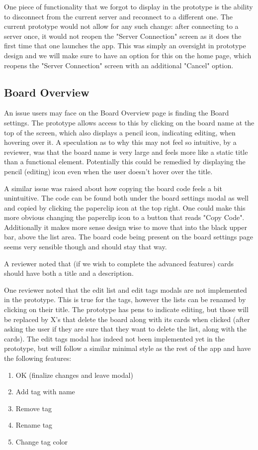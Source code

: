     One piece of functionality that we forgot to display in the prototype is the ability to disconnect from the current server and reconnect to a different one. The current prototype would not allow for any such change: after connecting to a server once, it would not reopen the "Server Connection" screen as it does the first time that one launches the app. This was simply an oversight in prototype design and we will make sure to have an option for this on the home page, which reopens the "Server Connection" screen with an additional "Cancel" option.

\subsection{Board Overview}

    An issue users may face on the Board Overview page is finding the Board settings. The prototype allows access to this by clicking on the board name at the top of the screen, which also displays a pencil icon, indicating editing, when hovering over it. A speculation as to why this may not feel so intuitive, by a reviewer, was that the board name is very large and feels more like a static title than a functional element. Potentially this could be remedied by displaying the pencil (editing) icon even when the user doesn't hover over the title.

    A similar issue was raised about how copying the board code feels a bit unintuitive. The code can be found both under the board settings modal as well and copied by clicking the paperclip icon at the top right. One could make this more obvious changing the paperclip icon to a button that reads "Copy Code". Additionally it makes more sense design wise to move that into the black upper bar, above the list area. The board code being present on the board settings page seems very sensible though and should stay that way.

    A reviewer noted that (if we wish to complete the advanced features) cards should have both a title and a description.

    One reviewer noted that the edit list and edit tags modals are not implemented in the prototype. This is true for the tags, however the lists can be renamed by clicking on their title. The prototype has pens to indicate editing, but those will be replaced by X's that delete the board along with its cards when clicked (after asking the user if they are sure that they want to delete the list, along with the cards). The edit tags modal has indeed not been implemented yet in the prototype, but will follow a similar minimal style as the rest of the app and have the following features:
\begin{enumerate}
    \item OK (finalize changes and leave modal)
    \item Add tag with name
    \item Remove tag
    \item Rename tag
    \item Change tag color
\end{enumerate}

